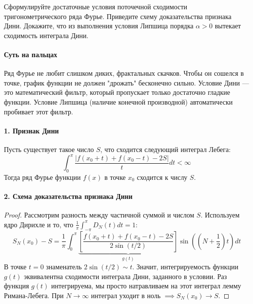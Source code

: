 {Сформулируйте достаточные условия поточечной сходимости тригонометрического ряда Фурье. Приведите схему доказательства признака Дини. Докажите, что из выполнения условия Липшица порядка $\alpha>0$ вытекает сходимость интеграла Дини.}

\paragraph{Суть на пальцах}
Ряд Фурье не любит слишком диких, фрактальных скачков. Чтобы он сошелся в точке, график функции не должен "дрожать" бесконечно сильно. Условие Дини — это математический фильтр, который пропускает только достаточно гладкие функции. Условие Липшица (наличие конечной производной) автоматически пробивает этот фильтр.

\paragraph{1. Признак Дини}
Пусть существует такое число $S$, что сходится следующий интеграл Лебега:
$$ \int_0^\pi \frac{|f(x_0+t) + f(x_0-t) - 2S|}{t} dt < \infty $$
Тогда ряд Фурье функции $f(x)$ в точке $x_0$ сходится к числу $S$.

\paragraph{2. Схема доказательства признака Дини}
\begin{proof}
Рассмотрим разность между частичной суммой и числом $S$. Используем ядро Дирихле и то, что $\frac{1}{\pi} \int_{-\pi}^\pi D_N(t) dt = 1$:
$$ S_N(x_0) - S = \frac{1}{\pi} \int_0^\pi \underbrace{\left[ \frac{f(x_0+t) + f(x_0-t) - 2S}{2 \sin(t/2)} \right]}_{g(t)} \sin\left(\left(N+\frac{1}{2}\right)t\right) dt $$
В точке $t=0$ знаменатель $2 \sin(t/2) \sim t$. Значит, интегрируемость функции $g(t)$ эквивалентна сходимости интеграла Дини, заданного в условии. Раз функция $g(t)$ интегрируема, мы просто натравливаем на этот интеграл лемму Римана-Лебега. При $N \to \infty$ интеграл уходит в ноль $\implies S_N(x_0) \to S$.
\end{proof}

